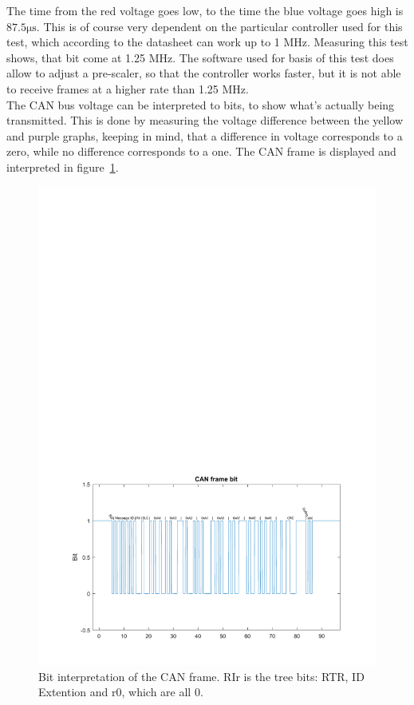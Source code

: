 The time from the red voltage goes low, to the time the blue voltage goes high is $87.5 \si{\micro\second}$.
This is of course very dependent on the particular controller used for this test, which according to the datasheet can work up to 1 MHz.
Measuring this test shows, that bit come at 1.25 MHz.
The software used for basis of this test does allow to adjust a pre-scaler, so that the controller works faster, but it is not able to receive frames at a higher rate than 1.25 MHz.\\

The CAN bus voltage can be interpreted to bits, to show what's actually being transmitted.
This is done by measuring the voltage difference between the yellow and purple graphs, keeping in mind, that a difference in voltage corresponds to a zero, while no difference corresponds to a one.
The CAN frame is displayed and interpreted in figure~\ref{fig:CAN_test1_message}.\\

\begin{figure}[h]
	\centering
	\includegraphics[width = \linewidth]{graphics/CAN_test1_message}
	\caption{Bit interpretation of the CAN frame. RIr  is the tree bits: RTR, ID Extention and r0, which are all 0.}
	\label{fig:CAN_test1_message}
\end{figure}

